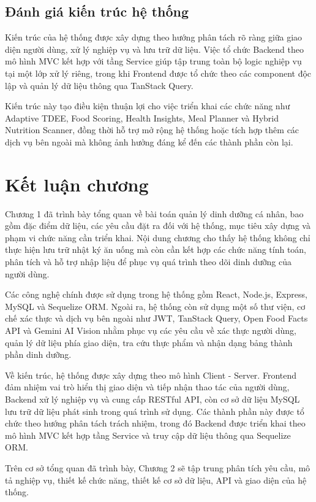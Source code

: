 \documentclass[12pt, a4paper]{report}
\begin{document}
\subsection{Đánh giá kiến trúc hệ thống}Kiến trúc của hệ thống được xây dựng theo hướng phân tách rõ ràng giữa giao diện người dùng, xử lý nghiệp vụ và lưu trữ dữ liệu. Việc tổ chức Backend theo mô hình MVC kết hợp với tầng Service giúp tập trung toàn bộ logic nghiệp vụ tại một lớp xử lý riêng, trong khi Frontend được tổ chức theo các component độc lập và quản lý dữ liệu thông qua TanStack Query.

Kiến trúc này tạo điều kiện thuận lợi cho việc triển khai các chức năng như Adaptive TDEE, Food Scoring, Health Insights, Meal Planner và Hybrid Nutrition Scanner, đồng thời hỗ trợ mở rộng hệ thống hoặc tích hợp thêm các dịch vụ bên ngoài mà không ảnh hưởng đáng kể đến các thành phần còn lại.

\section{Kết luận chương}Chương 1 đã trình bày tổng quan về bài toán quản lý dinh dưỡng cá nhân, bao gồm đặc điểm dữ liệu, các yêu cầu đặt ra đối với hệ thống, mục tiêu xây dựng và phạm vi chức năng cần triển khai. Nội dung chương cho thấy hệ thống không chỉ thực hiện lưu trữ nhật ký ăn uống mà còn cần kết hợp các chức năng tính toán, phân tích và hỗ trợ nhập liệu để phục vụ quá trình theo dõi dinh dưỡng của người dùng.

Các công nghệ chính được sử dụng trong hệ thống gồm React, Node.js, Express, MySQL và Sequelize ORM. Ngoài ra, hệ thống còn sử dụng một số thư viện, cơ chế xác thực và dịch vụ bên ngoài như JWT, TanStack Query, Open Food Facts API và Gemini AI Vision nhằm phục vụ các yêu cầu về xác thực người dùng, quản lý dữ liệu phía giao diện, tra cứu thực phẩm và nhận dạng bảng thành phần dinh dưỡng.

Về kiến trúc, hệ thống được xây dựng theo mô hình Client - Server. Frontend đảm nhiệm vai trò hiển thị giao diện và tiếp nhận thao tác của người dùng, Backend xử lý nghiệp vụ và cung cấp RESTful API, còn cơ sở dữ liệu MySQL lưu trữ dữ liệu phát sinh trong quá trình sử dụng. Các thành phần này được tổ chức theo hướng phân tách trách nhiệm, trong đó Backend được triển khai theo mô hình MVC kết hợp tầng Service và truy cập dữ liệu thông qua Sequelize ORM.

Trên cơ sở tổng quan đã trình bày, Chương 2 sẽ tập trung phân tích yêu cầu, mô tả nghiệp vụ, thiết kế chức năng, thiết kế cơ sở dữ liệu, API và giao diện của hệ thống.
\end{document}
